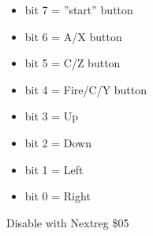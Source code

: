\begin{itemize}
\item[] bit 7 = ''start'' button
\item[] bit 6 = A/X button
\item[] bit 5 = C/Z button
\item[] bit 4 = Fire/C/Y button
\item[] bit 3 = Up
\item[] bit 2 = Down
\item[] bit 1 = Left
\item[] bit 0 = Right
\end{itemize}
Disable with Nextreg \$05
